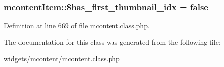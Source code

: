 \hypertarget{classmcontentItem_a8c95afa6c7bcad64626c9f343e77cdd4}{}
\subsubsection[{\$has\+\_\+first\+\_\+thumbnail\+\_\+idx}]{\setlength{\rightskip}{0pt plus 5cm}mcontent\+Item\+::\$has\+\_\+first\+\_\+thumbnail\+\_\+idx = false}\label{classmcontentItem_a8c95afa6c7bcad64626c9f343e77cdd4}


Definition at line 669 of file mcontent.\+class.\+php.



The documentation for this class was generated from the following file\+:\begin{DoxyCompactItemize}
\item 
widgets/mcontent/\hyperlink{mcontent_8class_8php}{mcontent.\+class.\+php}\end{DoxyCompactItemize}
